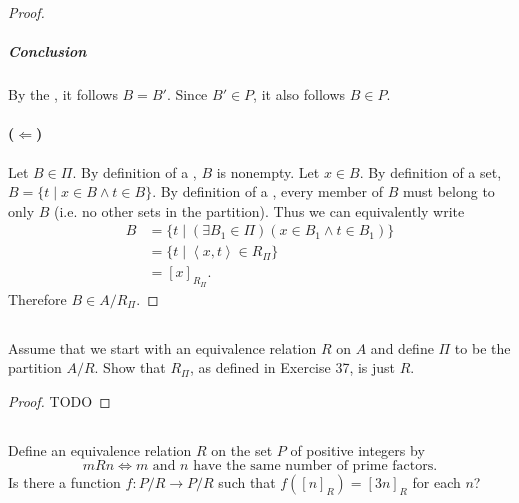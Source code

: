 \documentclass{report}
\newcommand{\pair}[1]{\left< #1 \right>}
\begin{document}
\begin{proof}
    \subparagraph{Conclusion}%

      By the , it follows $B = B'$.
      Since $B' \in P$, it also follows $B \in P$.

  \paragraph{($\Leftarrow$)}%

    Let $B \in \Pi$.
    By definition of a , $B$ is nonempty.
    Let $x \in B$.
    By definition of a set, $B = \{t \mid x \in B \land t \in B\}$.
    By definition of a , every member of $B$ must belong
      to only $B$ (i.e. no other sets in the partition).
    Thus we can equivalently write
      \begin{align*}
        B
          & = \{t \mid (\exists B_1 \in \Pi)(x \in B_1 \land t \in B_1)\} \\
          & = \{ t \mid \pair{x, t} \in R_\Pi \} \\
          & = [x]_{R_\Pi}.
      \end{align*}
    Therefore $B \in A / R_{\Pi}$.

\end{proof}

\subsection{}%

Assume that we start with an equivalence relation $R$ on $A$ and define $\Pi$ to
  be the partition $A / R$.
Show that $R_\Pi$, as defined in Exercise 37, is just $R$.

\begin{proof}

  TODO

\end{proof}

\subsection{}%

Define an equivalence relation $R$ on the set $P$ of positive integers by
  $$mRn \iff m \text{ and } n \text{ have the same number of prime factors}.$$
Is there a function $f \colon P / R \rightarrow P / R$ such that
  $f([n]_R) = [3n]_R$ for each $n$?
\end{document}

